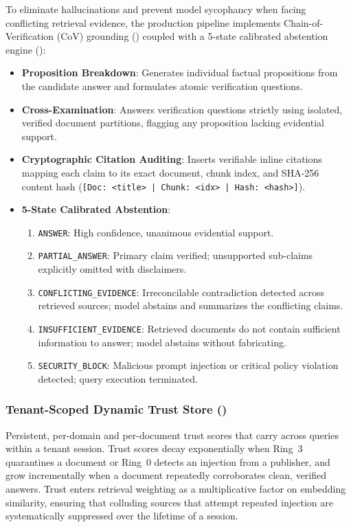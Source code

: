 To eliminate hallucinations and prevent model sycophancy when facing
conflicting retrieval evidence, the production pipeline implements
Chain-of-Verification (CoV) grounding ()
coupled with a 5-state calibrated abstention engine
():

\begin{itemize}
\item \textbf{Proposition Breakdown}: Generates individual factual
  propositions from the candidate answer and formulates atomic verification
  questions.
\item \textbf{Cross-Examination}: Answers verification questions strictly
  using isolated, verified document partitions, flagging any proposition
  lacking evidential support.
\item \textbf{Cryptographic Citation Auditing}: Inserts verifiable inline
  citations mapping each claim to its exact document, chunk index, and
  SHA-256 content hash (\texttt{[Doc: <title> | Chunk: <idx> | Hash: <hash>]}).
\item \textbf{5-State Calibrated Abstention}:
  \begin{enumerate}
  \item \texttt{ANSWER}: High confidence, unanimous evidential support.
  \item \texttt{PARTIAL\_ANSWER}: Primary claim verified; unsupported sub-claims
    explicitly omitted with disclaimers.
  \item \texttt{CONFLICTING\_EVIDENCE}: Irreconcilable contradiction detected
    across retrieved sources; model abstains and summarizes the conflicting
    claims.
  \item \texttt{INSUFFICIENT\_EVIDENCE}: Retrieved documents do not contain
    sufficient information to answer; model abstains without fabricating.
  \item \texttt{SECURITY\_BLOCK}: Malicious prompt injection or critical policy
    violation detected; query execution terminated.
  \end{enumerate}
\end{itemize}

\subsubsection{Tenant-Scoped Dynamic Trust Store ()}
\label{sec:trust-store}

Persistent, per-domain and per-document trust scores that carry across
queries within a tenant session. Trust scores decay exponentially when
Ring~3 quarantines a document or Ring~0 detects an injection from a publisher,
and grow incrementally when a document repeatedly corroborates clean,
verified answers. Trust enters retrieval weighting as a multiplicative factor
on embedding similarity, ensuring that colluding sources that attempt repeated
injection are systematically suppressed over the lifetime of a session.

